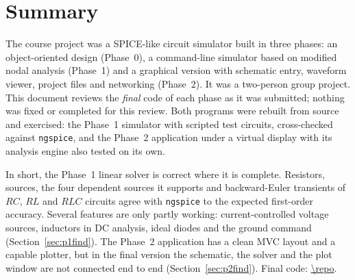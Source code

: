 
\newcommand{\ReportShortTitle}{OOP course project -- circuit simulator code review}


\section*{Summary}
The course project was a SPICE-like circuit simulator built in three phases: an object-oriented design
(Phase~0), a command-line simulator based on modified nodal analysis (Phase~1) and a graphical
version with schematic entry, waveform viewer, project files and networking (Phase~2). It was a
two-person group project. This document reviews the \emph{final} code of each phase as it was
submitted; nothing was fixed or completed for this review. Both programs were rebuilt from source and exercised:
the Phase~1 simulator with scripted test circuits, cross-checked against \texttt{ngspice}, and the Phase~2
application under a virtual display with its analysis engine also tested on its own.

In short, the Phase~1 linear solver is correct where it is complete. Resistors, sources, the four
dependent sources it supports and backward-Euler transients of $RC$, $RL$ and $RLC$ circuits agree
with \texttt{ngspice} to the expected first-order accuracy. Several features are only partly working:
current-controlled voltage sources, inductors in DC analysis, ideal diodes and the ground command
(Section~\ref{sec:p1find}). The Phase~2 application has a clean MVC layout and a capable plotter,
but in the final version the schematic, the solver and the plot window are not connected end to end
(Section~\ref{sec:p2find}). Final code: \url{\repo}.


